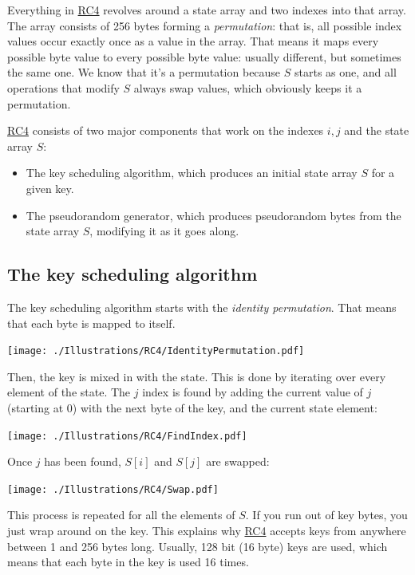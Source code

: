 \documentclass[11pt,ebook,table,dvipsnames]{memoir}
\begin{document}
Everything in \hyperref[RC4]{RC4} revolves around a state array and two indexes into
that array. The array consists of 256 bytes forming a \emph{permutation}:
that is, all possible index values occur exactly once as a value in
the array. That means it maps every possible byte value to every
possible byte value: usually different, but sometimes the same one. We
know that it's a permutation because $S$ starts as one, and all
operations that modify $S$ always swap values, which obviously keeps
it a permutation.

\hyperref[RC4]{RC4} consists of two major components that work on the indexes $i, j$
and the state array $S$:

\begin{itemize}
\item The key scheduling algorithm, which produces an initial state array
$S$ for a given key.
\item The pseudorandom generator, which produces pseudorandom bytes from
the state array $S$, modifying it as it goes along.
\end{itemize}

\subsection{The key scheduling algorithm}
\label{sec-2-3-11-1}

The key scheduling algorithm starts with the \emph{identity permutation}.
That means that each byte is mapped to itself.

\texttt{[image: ./Illustrations/RC4/IdentityPermutation.pdf]}

Then, the key is mixed in with the state. This is done by iterating
over every element of the state. The $j$ index is found by adding the
current value of $j$ (starting at 0) with the next byte of the key,
and the current state element:

\texttt{[image: ./Illustrations/RC4/FindIndex.pdf]}

Once $j$ has been found, $S[i]$ and $S[j]$ are swapped:

\texttt{[image: ./Illustrations/RC4/Swap.pdf]}

This process is repeated for all the elements of $S$. If you run out
of key bytes, you just wrap around on the key. This explains why \hyperref[RC4]{RC4}
accepts keys from anywhere between 1 and 256 bytes long. Usually, 128
bit (16 byte) keys are used, which means that each byte in the key is
used 16 times.
\end{document}
